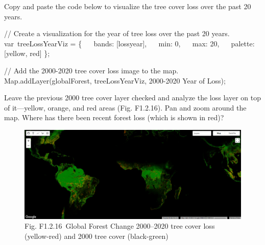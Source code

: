 \documentclass[
  letterpaper,
  DIV=11,
  numbers=noendperiod]{scrreprt}
\newenvironment{Shaded}{\begin{snugshade}}{\end{snugshade}}
\newcommand{\BuiltInTok}[1]{\textcolor[rgb]{0.00,0.23,0.31}{#1}}
\newcommand{\CommentTok}[1]{\textcolor[rgb]{0.37,0.37,0.37}{#1}}
\newcommand{\DataTypeTok}[1]{\textcolor[rgb]{0.68,0.00,0.00}{#1}}
\newcommand{\DecValTok}[1]{\textcolor[rgb]{0.68,0.00,0.00}{#1}}
\newcommand{\FunctionTok}[1]{\textcolor[rgb]{0.28,0.35,0.67}{#1}}
\newcommand{\NormalTok}[1]{\textcolor[rgb]{0.00,0.23,0.31}{#1}}
\newcommand{\OperatorTok}[1]{\textcolor[rgb]{0.37,0.37,0.37}{#1}}
\newcommand{\StringTok}[1]{\textcolor[rgb]{0.13,0.47,0.30}{#1}}
\begin{document}
Copy and paste the code below to visualize the tree cover loss over the
past 20 years.

\begin{Shaded}
\begin{Highlighting}[]
\CommentTok{// Create a visualization for the year of tree loss over the past 20 years.  }
\NormalTok{var treeLossYearViz }\OperatorTok{=}\NormalTok{ \{  }
  \DataTypeTok{ bands}\OperatorTok{:}\NormalTok{ [}\StringTok{\textquotesingle{}lossyear\textquotesingle{}}\NormalTok{]}\OperatorTok{,}  
  \DataTypeTok{ min}\OperatorTok{:} \DecValTok{0}\OperatorTok{,}  
  \DataTypeTok{ max}\OperatorTok{:} \DecValTok{20}\OperatorTok{,}  
  \DataTypeTok{ palette}\OperatorTok{:}\NormalTok{ [}\StringTok{\textquotesingle{}yellow\textquotesingle{}}\OperatorTok{,} \StringTok{\textquotesingle{}red\textquotesingle{}}\NormalTok{]  }
\NormalTok{\}}\OperatorTok{;}  
  
\CommentTok{// Add the 2000{-}2020 tree cover loss image to the map.  }
\BuiltInTok{Map}\OperatorTok{.}\FunctionTok{addLayer}\NormalTok{(globalForest}\OperatorTok{,}\NormalTok{ treeLossYearViz}\OperatorTok{,} \StringTok{\textquotesingle{}2000{-}2020 Year of Loss\textquotesingle{}}\NormalTok{)}\OperatorTok{;}
\end{Highlighting}
\end{Shaded}

Leave the previous 2000 tree cover layer checked and analyze the loss
layer on top of it---yellow, orange, and red areas (Fig. F1.2.16). Pan
and zoom around the map. Where has there been recent forest loss (which
is shown in red)?

\begin{figure}

{\centering \includegraphics{./F1/image16.png}

}

\caption{Fig. F1.2.16~Global Forest Change 2000--2020 tree cover loss
(yellow-red) and 2000 tree cover (black-green)}

\end{figure}
\end{document}
